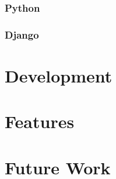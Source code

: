 \documentclass{article}
\begin{document}
		\subsubsection{Python}
		\subsubsection{Django}
\section{Development}
\section{Features}
\section{Future Work}

\printbibliography[title={Bibliography}]
\end{document}
